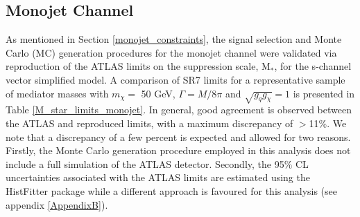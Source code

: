 \subsection{Monojet Channel}
\label{monojet_validation}
\begin{flushleft}
As mentioned in Section \ref{monojet_constraints}, the signal selection and Monte Carlo (MC) generation procedures for the monojet channel were validated via reproduction of the ATLAS limits on the suppression scale, M$_{*}$, for the s-channel vector simplified model. A comparison of SR7 limits for a representative sample of mediator masses with $m_{\chi} = $ 50 GeV, $\Gamma = M/8\pi$ and $\sqrt{g_{q}g_{\chi}} = 1$ is presented in Table \ref{M_star_limits_monojet}. In general, good agreement is observed between the ATLAS and reproduced limits, with a maximum discrepancy of $>$11\%. We note that a discrepancy of a few percent is expected and allowed for two reasons. Firstly, the Monte Carlo generation procedure employed in this analysis does not include a full simulation of the ATLAS detector.  Secondly, the 95\% CL uncertainties associated with the ATLAS limits are estimated using the HistFitter package while a different approach is favoured for this analysis (see appendix \ref{AppendixB}). 




\end{flushleft}
